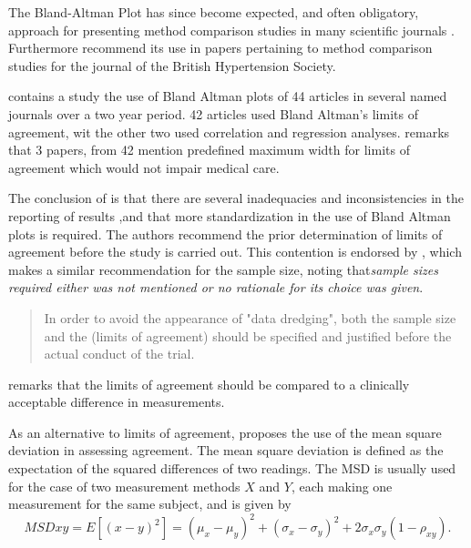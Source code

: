 \documentclass[12pt, a4paper]{report}
\theoremstyle{plain}
\theoremstyle{definition}
\theoremstyle{remark}
\begin{document}
	The Bland-Altman Plot has since become expected, and
	often obligatory, approach for presenting method comparison
	studies in many scientific journals \citep{hollis}. Furthermore
	\citet{BritHypSoc} recommend its use in papers pertaining to
	method comparison studies for the journal of the British
	Hypertension Society.
	

	\citet{mantha} contains a study the use of Bland Altman plots of
	44 articles in several named journals over a two year period. 42
	articles used Bland Altman's limits of agreement, wit the other
	two used correlation and regression analyses. \citet{mantha}
	remarks that 3 papers, from 42 mention predefined maximum width
	for limits of agreement which would not impair medical care.
	
	The conclusion of \citet{mantha} is that there are several
	inadequacies and inconsistencies in the reporting of results ,and
	that more standardization in the use of Bland Altman plots is
	required. The authors recommend the prior determination of limits
	of agreement before the study is carried out. This contention is
	endorsed by \citet{lin}, which makes a similar recommendation for
	the sample size, noting that\emph{sample sizes required either was
		not mentioned or no rationale for its choice was given}.
	
	\begin{quote}
		In order to avoid the appearance of "data dredging", both the
		sample size and the (limits of agreement) should be specified and
		justified before the actual conduct of the trial. \citep{lin}
	\end{quote}
	
	\citet{Dewitte} remarks that the limits of agreement should be
	compared to a clinically acceptable difference in measurements.

	As an alternative to limits of agreement, \citet{lin2002} proposes the use of
	the mean square deviation in assessing agreement. The mean square
	deviation is defined as the expectation of the squared differences
	of two readings. The MSD is usually used for the case of two
	measurement methods $X$ and $Y$, each making one measurement for
	the same subject, and is given by
	\[
	MSDxy = E[(x - y)^2]  = (\mu_{x} - \mu_{y})^2 + (\sigma_{x} -
	\sigma_{y})^2 + 2\sigma_{x}\sigma_{y}(1-\rho_{xy}).
	\]
	
\end{document}
